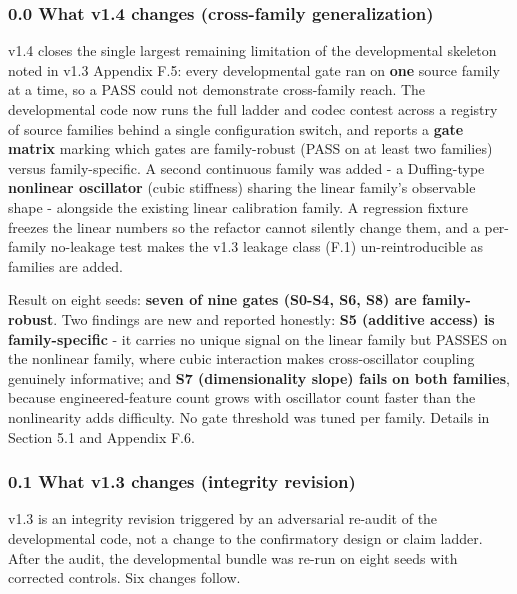 \documentclass[
  11pt,
]{article}
\begin{document}
\subsubsection{0.0 What v1.4 changes
(cross-family
generalization)}\label{what-v1.4-changes-cross-family-generalization}

v1.4 closes the single largest remaining
limitation of the developmental skeleton noted
in v1.3 Appendix F.5: every developmental gate
ran on \textbf{one} source family at a time, so
a PASS could not demonstrate cross-family reach.
The developmental code now runs the full ladder
and codec contest across a registry of source
families behind a single configuration switch,
and reports a \textbf{gate matrix} marking which
gates are family-robust (PASS on at least two
families) versus family-specific. A second
continuous family was added - a Duffing-type
\textbf{nonlinear oscillator} (cubic stiffness)
sharing the linear family's observable shape -
alongside the existing linear calibration
family. A regression fixture freezes the linear
numbers so the refactor cannot silently change
them, and a per-family no-leakage test makes the
v1.3 leakage class (F.1) un-reintroducible as
families are added.

Result on eight seeds: \textbf{seven of nine
gates (S0-S4, S6, S8) are family-robust}. Two
findings are new and reported honestly:
\textbf{S5 (additive access) is family-specific}
- it carries no unique signal on the linear
family but PASSES on the nonlinear family, where
cubic interaction makes cross-oscillator
coupling genuinely informative; and \textbf{S7
(dimensionality slope) fails on both families},
because engineered-feature count grows with
oscillator count faster than the nonlinearity
adds difficulty. No gate threshold was tuned per
family. Details in Section 5.1 and Appendix F.6.

\subsubsection{0.1 What v1.3 changes (integrity
revision)}\label{what-v1.3-changes-integrity-revision}

v1.3 is an integrity revision triggered by an
adversarial re-audit of the developmental code,
not a change to the confirmatory design or claim
ladder. After the audit, the developmental
bundle was re-run on eight seeds with corrected
controls. Six changes follow.
\end{document}
